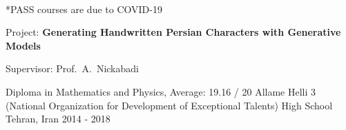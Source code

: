 \begin{cventries}
{\begin{cvitems}
{\begin{adjustwidth}{4mm}{}
\begin{tabular}{l@{\hskip 5mm}l@{\hskip 5mm}l}
            \end{tabular}
            \\[1mm]
            {\fontsize{8pt}{1em}\bodyfontlight\upshape\color{text} *PASS courses are due to COVID-19}
          	\medskip
          \end{adjustwidth}
        }
        \item{
          Project: \textbf{Generating Handwritten Persian Characters with Generative Models}
        }
        \item{
          Supervisor: Prof.~A.~Nickabadi
        }
      \end{cvitems}
    }

  \cventry
    {Diploma in Mathematics and Physics, Average: 19.16 / 20} %
    {{\fontsize{9.8pt}{1em}\bodyfont Allame Helli 3 (National Organization for Development of Exceptional Talents) High School}}
    {Tehran, Iran} %
    {2014 - 2018} %
    {} \vspace*{-5mm}

\end{cventries}

